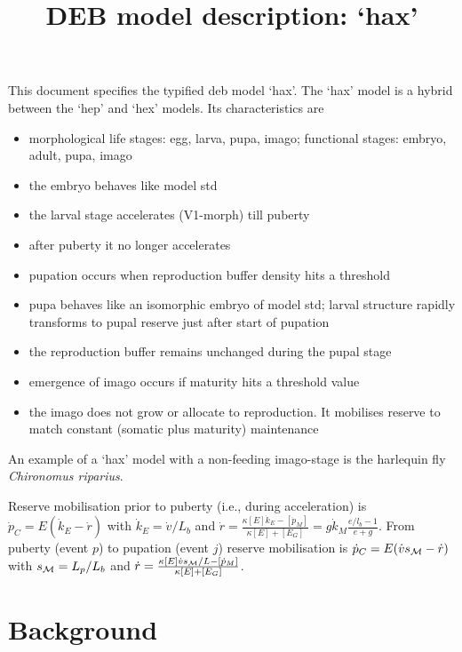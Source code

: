 \documentclass{article}
\title{DEB model description: `hax'}
\begin{document}
\maketitle

This document specifies the typified  {\sc deb}  model `hax'.
The `hax' model is a hybrid between the `hep' and `hex' models. Its characteristics are
\begin{itemize}
  \item  morphological life stages: egg, larva, pupa, imago; functional stages: embryo, adult, pupa, imago
 \item  the embryo behaves like model std
 \item the larval stage accelerates (V1-morph) till puberty
 \item after puberty it no longer accelerates
 \item  pupation occurs when reproduction buffer density hits a threshold
 \item  pupa behaves like an isomorphic embryo of model std; larval structure rapidly transforms to pupal reserve just after start of pupation
 \item  the reproduction buffer remains unchanged during the pupal stage
 \item emergence of imago occurs if maturity hits a threshold value
 \item  the imago does not grow or allocate to reproduction. It mobilises reserve to match constant (somatic plus maturity) maintenance
\end{itemize}
  
An example of a `hax' model with a non-feeding imago-stage is the harlequin fly \emph{Chironomus riparius}.

Reserve mobilisation prior to puberty (i.e., during acceleration) is $\dot{p}_C = E (\dot{k}_E - \dot{r})$ 
  with $\dot{k}_E = \dot{v}/ L_b$ and $\dot{r} = \frac{\kappa [E] \dot{k}_E - [\dot{p}_M]} {\kappa [E] + [E_G]} = g \dot{k}_M \frac{e/ l_b - 1} {e + g}$. 
  From puberty (event $p$) to pupation (event $j$) reserve mobilisation is $\dot{p}_C = E (\dot{v} s_{\cal M}- \dot{r})$ with $s_{\cal M}=L_p/L_b$ and 
  $\dot{r} = \frac{\kappa [E] \dot{v}s_{\cal M}/L - [\dot{p}_M]} {\kappa [E] + [E_G]}$.

\section{Background}







\end{document}
